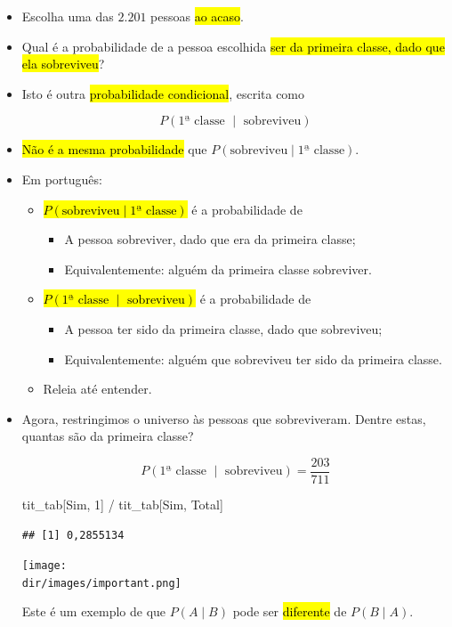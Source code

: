 \documentclass[
  11pt]{report}
\newenvironment{Shaded}{\begin{snugshade}}{\end{snugshade}}
\newcommand{\NormalTok}[1]{#1}
\newcommand{\SpecialCharTok}[1]{\textcolor[rgb]{0.00,0.00,0.00}{#1}}
\newcommand{\StringTok}[1]{\textcolor[rgb]{0.31,0.60,0.02}{#1}}
\newcommand{\dir}{/ssd/R/x86_64-pc-linux-gnu-library/4.3/fnaufelRmd/rmarkdown/resources}
\newenvironment{rmdimportant}
{
  \begin{myimportant}
    \texttt{[image: \\dir/images/important.png]}
    \tcblower
  }
  {
  \end{myimportant}
}
\renewenvironment{Shaded}{
    \begin{mdframed}[%
      roundcorner=2pt,%
      innerleftmargin=5pt,%
      innerrightmargin=5pt,%
      topline=true,%
      leftline=true,%
      rightline=true,%
      bottomline=true,%
      linewidth=0.5pt,%
      linecolor=black!20,%
      backgroundcolor=black!2,%
      skipabove=2ex,%
      skipbelow=2.5ex%
    ]%
  }
  {
    \end{mdframed}
  }
\begin{document}
\begin{itemize}
\item
  Escolha uma das $2.201$ pessoas {\hl{ao acaso}}.
\item
  Qual é a probabilidade de a pessoa escolhida {\hl{ser da primeira classe, dado que ela sobreviveu}}?
\item
  Isto é outra {\hl{probabilidade condicional}}, escrita como

  \[
  P(\text{1ª classe } \mid \text{ sobreviveu})
  \]
\item
  {\hl{Não é a mesma probabilidade}} que $P(\text{sobreviveu} \mid \text{1ª classe})$.
\item
  Em português:

  \begin{itemize}
  \item
    {\hl{$P(\text{sobreviveu} \mid \text{1ª classe})$}} é a probabilidade de

    \begin{itemize}
    \item
      A pessoa sobreviver, dado que era da primeira classe;
    \item
      Equivalentemente: alguém da primeira classe sobreviver.
    \end{itemize}
  \item
    {\hl{$P(\text{1ª classe } \mid \text{ sobreviveu})$}} é a probabilidade de

    \begin{itemize}
    \item
      A pessoa ter sido da primeira classe, dado que sobreviveu;
    \item
      Equivalentemente: alguém que sobreviveu ter sido da primeira classe.
    \end{itemize}
  \item
    Releia até entender.
  \end{itemize}
\item
  Agora, restringimos o universo às pessoas que sobreviveram. Dentre estas, quantas são da primeira classe?

  \[
  P(\text{1ª classe } \mid \text{ sobreviveu}) = 
  \frac
  {203}
  {711}
  \]

\begin{Shaded}
\begin{Highlighting}[]
\NormalTok{tit\_tab[}\StringTok{\textquotesingle{}Sim\textquotesingle{}}\NormalTok{, }\StringTok{\textquotesingle{}1\textquotesingle{}}\NormalTok{] }\SpecialCharTok{/}\NormalTok{ tit\_tab[}\StringTok{\textquotesingle{}Sim\textquotesingle{}}\NormalTok{, }\StringTok{\textquotesingle{}Total\textquotesingle{}}\NormalTok{]}
\end{Highlighting}
\end{Shaded}

\begin{verbatim}
## [1] 0,2855134
\end{verbatim}

  \begin{rmdimportant}
  Este é um exemplo de que $P(A \mid B)$ pode ser {\hl{diferente}} de $P(B \mid A)$.

  \end{rmdimportant}
\end{itemize}
\end{document}
